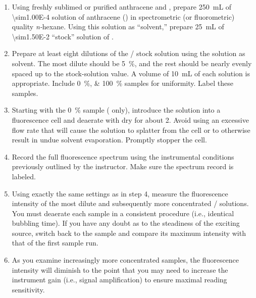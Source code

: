 \documentclass[nobib,nofonts,nols,nohyper]{tufte-handout}
\begin{document}
\begin{enumerate}
	\item Using freshly sublimed or purified anthracene and , prepare \qty{250}{\mL} of \qty{\sim1.00E-4}{\Molar} solution of anthracene () in spectrometric (or fluorometric) quality \emph{n-}hexane. 
	Using this solution as ``solvent,'' prepare \qty{25}{\mL} of \qty{\sim1.50E-2}{\Molar} ``stock'' solution of .
	\item Prepare at least eight dilutions of the / stock solution using the  solution as solvent.
	The most dilute should be \qty{5}{\percent}, and the rest should be nearly evenly spaced up to the stock-solution value. 
	A volume of \qty{10}{\mL} of each solution is appropriate. 
	Include \qtylist{0;100}{\percent} samples for uniformity. 
	Label these samples.
	\item Starting with the \qty{0}{\percent} sample ( only), introduce the solution into a fluorescence cell and deaerate with dry  for about \qty{2}{\min}. 
	Avoid using an excessive flow rate that will cause the solution to splatter from the cell or to otherwise result in undue solvent evaporation. 
	Promptly stopper the cell.
	\item Record the full fluorescence spectrum using the instrumental conditions previously outlined by the instructor.
	Make sure the spectrum record is labeled.
	\item Using exactly the same settings as in step 4, measure the  fluorescence intensity of the most dilute and subsequently more concentrated / solutions. 
	You must deaerate each sample in a consistent procedure (i.e., identical bubbling time). 
	If you have any doubt as to the steadiness of the exciting source, switch back to the  sample and compare its maximum intensity with that of the first sample run.
	\item As you examine increasingly more concentrated samples, the fluorescence intensity will diminish to the point that you may need to increase the instrument gain (i.e., signal amplification) to ensure maximal reading sensitivity. 

\end{enumerate}
\end{document}
